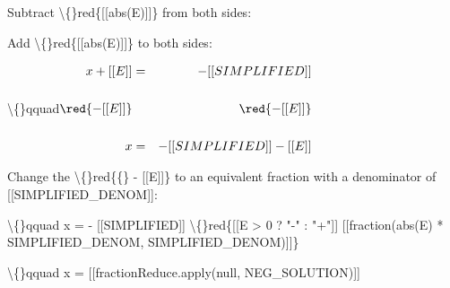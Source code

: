 \documentclass{article}
\begin{document}
\begin{itemize}
                                
                                    Subtract
                                    \textbackslash\{\}red\{[[abs(E)]]\}
                                    from both
                                    sides:
                                
                                    Add
                                    \textbackslash\{\}red\{[[abs(E)]]\}
                                    to both
                                    sides:
                                
                                \textbackslash\{\}qquad$\begin{aligned}
                                    x + [[E]] &=&
                                    -[[SIMPLIFIED]] \\ \\
                                    \red{- [[E]]} &&
                                    \red{- [[E]]} \\ \\
                                    x &=& -[[SIMPLIFIED]] -
                                    [[E]]
                                    \end{aligned}$
                                
                            
                            
                                
                                    Change the
                                    \textbackslash\{\}red\{\{\} - [[E]]\}
                                    to an equivalent fraction with a
                                    denominator of
                                    [[SIMPLIFIED\_DENOM]]:
                                
                                \textbackslash\{\}qquad
                                    x = - [[SIMPLIFIED]]
                                    \textbackslash\{\}red\{[[E > 0 ? "-" : "+"]]
                                    [[fraction(abs(E) * SIMPLIFIED\_DENOM,
                                    SIMPLIFIED\_DENOM)]]\}
                                
                            
                            \textbackslash\{\}qquad
                                x = [[fractionReduce.apply(null,
                                NEG\_SOLUTION)]]
                            
                            
                                

\end{itemize}
\end{document}
